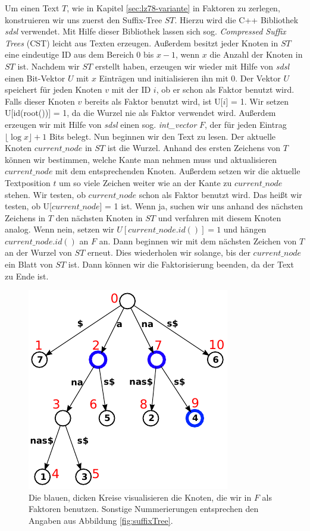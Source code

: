 \documentclass[a4paper,11pt]{scrartcl}%
\theoremstyle{change}
\theoremstyle{nonumberplain}
\theoremstyle{change}
\theoremstyle{nonumberplain}
\theoremstyle{change}
\theoremstyle{nonumberplain}
\begin{document}
		Um einen Text $T$, wie in Kapitel \ref{sec:lz78-variante} in Faktoren zu zerlegen, konstruieren wir uns zuerst den Suffix-Tree $ST$. Hierzu wird die C++ Bibliothek \textit{sdsl} verwendet. Mit Hilfe dieser Bibliothek lassen sich sog. \textit{Compressed Suffix Trees} (CST) leicht aus Texten erzeugen. Außerdem besitzt jeder Knoten in $ST$ eine eindeutige ID aus dem Bereich 0 bis $x-1$, wenn $x$ die Anzahl der Knoten in $ST$ ist. Nachdem wir $ST$ erstellt haben, erzeugen wir wieder mit Hilfe von \textit{sdsl} einen Bit-Vektor $U$ mit $x$ Einträgen und initialisieren ihn mit 0. Der Vektor $U$ speichert für jeden Knoten $v$ mit der ID $i$, ob er schon als Faktor benutzt wird. Falls dieser Knoten $v$ bereits als Faktor benutzt wird, ist U[$i$] = 1. Wir setzen U[id(root())] = 1, da die Wurzel nie als Faktor verwendet wird. Außerdem erzeugen wir mit Hilfe von \textit{sdsl} einen sog. \textit{int\_vector} $F$, der für jeden Eintrag $\lfloor\log x\rfloor + 1$ Bits belegt.
		Nun beginnen wir den Text zu lesen. Der aktuelle Knoten $current\_node$ in $ST$ ist die Wurzel. Anhand des ersten Zeichens von $T$ können wir bestimmen, welche Kante man nehmen muss und aktualisieren $current\_node$ mit dem entsprechenden Knoten. Außerdem setzen wir die aktuelle Textposition $t$ um so viele Zeichen weiter wie an der Kante zu $current\_node$ stehen. Wir testen, ob $current\_node$ schon als Faktor benutzt wird. Das heißt wir testen, ob U[$current\_node$] = 1 ist. Wenn ja, suchen wir uns anhand des nächsten Zeichens in $T$ den nächsten Knoten in $ST$ und verfahren mit diesem Knoten analog.
		Wenn nein, setzen wir $U[current\_node.id()] = 1$ und hängen $current\_node.id()$ an $F$ an. Dann beginnen wir mit dem nächsten Zeichen von $T$ an der Wurzel von $ST$ erneut. Dies wiederholen wir solange, bis der $current\_node$ ein Blatt von $ST$ ist. Dann können wir die Faktorisierung beenden, da der Text zu Ende ist.
		\begin{figure}[h]
			\centering
			\includegraphics[scale=0.8]{ananas_suffixTree_inorder_markiert}
			\caption{Die blauen, dicken Kreise visualisieren die Knoten, die wir in $F$ als Faktoren benutzen. Sonstige Nummerierungen entsprechen den Angaben aus Abbildung \ref{fig:suffixTree}.}
			\label{fig:st_inorder}
		\end{figure}
\end{document}

